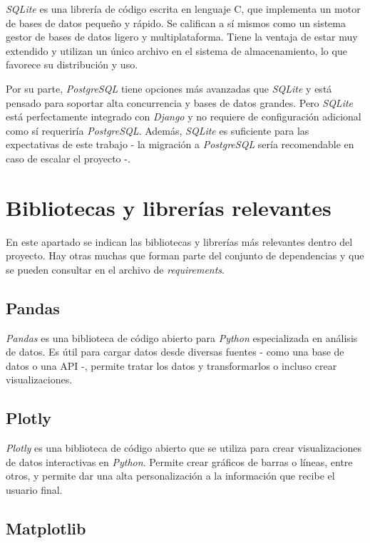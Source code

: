 \emph{SQLite} es una librería de código escrita en lenguaje C, que implementa un motor de bases de datos pequeño y rápido. Se califican a sí mismos como un sistema gestor de bases de datos ligero y multiplataforma. Tiene la ventaja de estar muy extendido y utilizan un único archivo en el sistema de almacenamiento, lo que favorece su distribución y uso. 

Por su parte, \emph{PostgreSQL} tiene opciones más avanzadas que \emph{SQLite} y está pensado
 para soportar alta concurrencia y bases de datos grandes. Pero \emph{SQLite} está
 perfectamente integrado con \emph{Django} y no requiere de configuración adicional como sí requeriría \emph{PostgreSQL}. Además, \emph{SQLite} es suficiente para las expectativas de 
 este trabajo - la migración a \emph{PostgreSQL} sería recomendable en caso de escalar el proyecto -.


\section{Bibliotecas y librerías relevantes}\label{librerias_relevantes}

En este apartado se indican las bibliotecas y librerías más relevantes dentro del proyecto. Hay otras muchas que forman parte del conjunto de dependencias y que se pueden consultar en el archivo de \emph{requirements}.

\subsection{Pandas}\label{pandas}

\emph{Pandas} \citep{online:pandas} es una biblioteca de código abierto para \emph{Python} especializada en análisis de datos. Es útil para cargar datos desde diversas fuentes - como una base de datos o una API -, permite tratar los datos y transformarlos o incluso crear visualizaciones. 

\subsection{Plotly}\label{plotly}

\emph{Plotly} \citep{online:plotly} es una biblioteca de código abierto que se utiliza para crear visualizaciones de datos interactivas en \emph{Python}. Permite crear gráficos de barras o líneas, entre otros, y permite dar una alta personalización a la información que recibe el usuario final. 

\subsection{Matplotlib}\label{matplotlib}

